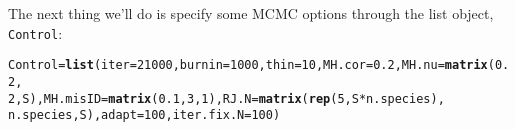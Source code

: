 \documentclass{article}\usepackage{graphicx, color}
\makeatletter
\newcommand{\hlfunctioncall}[1]{\textcolor[rgb]{0.501960784313725,0,0.329411764705882}{\textbf{#1}}}%
\newenvironment{kframe}{%
 \def\at@end@of@kframe{}%
 \ifinner\ifhmode%
  \def\at@end@of@kframe{\end{minipage}}%
  \begin{minipage}{\columnwidth}%
 \fi\fi%
 \def\FrameCommand##1{\hskip\@totalleftmargin \hskip-\fboxsep
 \colorbox{shadecolor}{##1}\hskip-\fboxsep
     \hskip-\linewidth \hskip-\@totalleftmargin \hskip\columnwidth}%
 \MakeFramed {\advance\hsize-\width
   \@totalleftmargin\z@ \linewidth\hsize
   \@setminipage}}%
 {\par\unskip\endMakeFramed%
 \at@end@of@kframe}
\newenvironment{knitrout}{}{} %
\makeatother
\begin{document}
The next thing we'll do is specify some MCMC options through the list object, \texttt{Control}:

\begin{knitrout}
\color{fgcolor}\begin{kframe}
\begin{alltt}
Control = \hlfunctioncall{list}(iter = 21000, burnin = 1000, thin = 10, MH.cor = 0.2, MH.nu = \hlfunctioncall{matrix}(0.2, 
    2, S), MH.misID = \hlfunctioncall{matrix}(0.1, 3, 1), RJ.N = \hlfunctioncall{matrix}(\hlfunctioncall{rep}(5, S * n.species), 
    n.species, S), adapt = 100, iter.fix.N = 100)
\end{alltt}
\end{kframe}
\end{knitrout}
\end{document}
